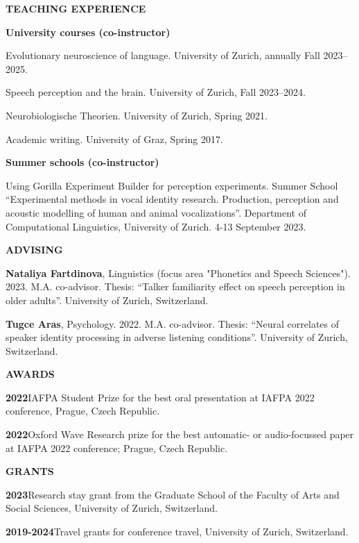 \documentclass[11pt]{article}
\newcommand{\hangpara}{
 \setlength{\parindent}{0in} %
 \hangindent=0.42in %
}
\begin{document}
\vskip 20pt
\begin{flushleft}
{\bf TEACHING EXPERIENCE}
\end{flushleft}
\begin{flushleft}
{\bf University courses (co-instructor)}
\end{flushleft}
\hangpara Evolutionary neuroscience of language. University of Zurich, annually Fall 2023--2025.
\vskip 6pt
\hangpara Speech perception and the brain. University of Zurich, Fall 2023--2024.
\vskip 6pt
\hangpara Neurobiologische Theorien. University of Zurich, Spring 2021.
\hangpara Academic writing. University of Graz, Spring 2017.




\begin{flushleft}
{\bf Summer schools (co-instructor)}
\end{flushleft}
\hangpara Using Gorilla Experiment Builder for perception experiments. Summer School “Experimental methods in vocal identity research. Production, perception and acoustic modelling of human and animal vocalizations”. Department of Computational Linguistics, University of Zurich. 4-13 September 2023.




\vskip 20pt
\begin{flushleft}
{\bf ADVISING}
\end{flushleft}
\hangpara \textbf{Nataliya Fartdinova}, Linguistics (focus area "Phonetics and Speech Sciences"). 2023. M.A. co-advisor. Thesis: “Talker familiarity effect on speech perception in older adults”. University of Zurich, Switzerland.
\vskip 6pt
\hangpara \textbf{Tugce Aras}, Psychology. 2022. M.A. co-advisor. Thesis: “Neural correlates of speaker identity processing in adverse listening conditions”. University of Zurich, Switzerland.




\vskip 20pt
\begin{flushleft}
{\bf AWARDS}
\end{flushleft}
\hangpara
{\bf 2022}\hspace{1ex}IAFPA Student Prize for the best oral presentation at IAFPA 2022 conference, Prague, Czech Republic.
\vskip 6pt
\hangpara
{\bf 2022}\hspace{1ex}Oxford Wave Research prize for the best automatic- or audio-focussed paper at IAFPA 2022 conference; Prague, Czech Republic. %




\vskip 20pt
\begin{flushleft}
{\bf GRANTS}
\end{flushleft}
\hangpara
{\bf 2023}\hspace{1ex}Research stay grant from the Graduate School of the Faculty of Arts and Social Sciences, University of Zurich, Switzerland. %
\vskip 6pt
\hangpara
{\bf 2019-2024}\hspace{1ex}Travel grants for conference travel, University of Zurich, Switzerland. %
\end{document}
